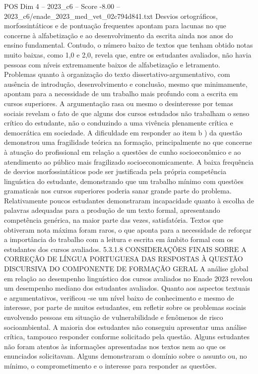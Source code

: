 \begin{textsample}{POS Dim 4 – 2023\_c6 – Score -8.00 – 2023\_c6/enade\_2023\_med\_vet\_02c794d841.txt}
Desvios ortográficos, morfossintáticos e de pontuação frequentes apontam para lacunas no que concerne à alfabetização e ao desenvolvimento da escrita ainda nos anos do ensino fundamental.
Contudo, o número baixo de textos que tenham obtido notas muito baixas, como 1,0 e 2,0, revela que, entre os estudantes avaliados, não havia pessoas com níveis extremamente baixos de alfabetização e letramento.
Problemas quanto à organização do texto dissertativo-argumentativo, com ausência de introdução, desenvolvimento e conclusão, mesmo que minimamente, apontam para a necessidade de um trabalho mais profundo com a escrita em cursos superiores.
A argumentação rasa ou mesmo o desinteresse por temas sociais revelam o fato de que alguns dos cursos estudados não trabalham o senso crítico do estudante, não o conduzindo a uma vivência plenamente crítica e democrática em sociedade.
A dificuldade em responder ao item b ) da questão demonstrou uma fragilidade teórica na formação, principalmente no que concerne à atuação do profissional em relação a questões de cunho socioeconômico e ao atendimento ao público mais fragilizado socioeconomicamente.
A baixa frequência de desvios morfossintáticos pode ser justificada pela própria competência linguística do estudante, demonstrando que um trabalho mínimo com questões gramaticais nos cursos superiores poderia sanar grande parte do problema.
Relativamente poucos estudantes demonstraram incapacidade quanto à escolha de palavras adequadas para a produção de um texto formal, apresentando competência genérica, na maior parte das vezes, satisfatória.
Textos que obtiveram nota máxima foram raros, o que aponta para a necessidade de reforçar a importância do trabalho com a leitura e escrita em âmbito formal com os estudantes dos cursos avaliados. 5.3.1.8 CONSIDERAÇÕES FINAIS SOBRE A CORREÇÃO DE LÍNGUA PORTUGUESA DAS RESPOSTAS À QUESTÃO DISCURSIVA DO COMPONENTE DE FORMAÇÃO GERAL A análise global em relação ao desempenho linguístico dos cursos avaliados no Enade 2023 revelou um desempenho mediano dos estudantes avaliados.
Quanto aos aspectos textuais e argumentativos, verificou -se um nível baixo de conhecimento e mesmo de interesse, por parte de muitos estudantes, em refletir sobre os problemas sociais envolvendo pessoas em situação de vulnerabilidade e fenômenos de risco socioambiental.
A maioria dos estudantes não conseguiu apresentar uma análise crítica, tampouco responder conforme solicitado pela questão.
Alguns estudantes não foram atentos às informações apresentadas nos textos nem ao que os enunciados solicitavam.
Alguns demonstraram o domínio sobre o assunto ou, no mínimo, o comprometimento e o interesse para responder as questões.

\end{textsample}
